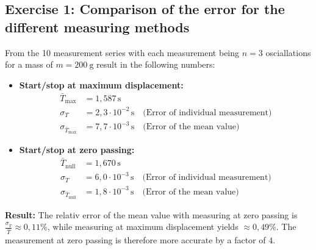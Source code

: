 \subsection{Exercise 1: Comparison of the error for the different measuring methods}
From the 10 measurement series with each measurement being $n=3$ osciallations for a mass of $m = \qty{200}{\gram}$ result in the following numbers:
\begin{itemize}
    \item \textbf{Start/stop at maximum displacement:}
    \begin{align*}
        \bar{T}_{\text{max}} &= 1{,}587\,\mathrm{s} \\
        \sigma_T &= 2{,}3 \cdot 10^{-2}\,\mathrm{s} \quad \text{(Error of individual measurement)} \\
        \sigma_{\bar{T}_{\text{max}}} &= 7{,}7 \cdot 10^{-3}\,\mathrm{s} \quad \text{(Error of the mean value)}
    \end{align*}
    
    \item \textbf{Start/stop at zero passing:}
    \begin{align*}
        \bar{T}_{\text{null}} &= 1{,}670\,\mathrm{s} \\
        \sigma_T &= 6{,}0 \cdot 10^{-3}\,\mathrm{s} \quad \text{(Error of individual measurement)} \\
        \sigma_{\bar{T}_{\text{null}}} &= 1{,}8 \cdot 10^{-3}\,\mathrm{s} \quad \text{(Error of the mean value)}
    \end{align*}
\end{itemize}

\textbf{Result:} The relativ error of the mean value with measuring at zero passing is $\frac{\sigma_{\bar{T}}}{\bar{T}} \approx 0{,}11\%$, while measuring at maximum displacement yields $\approx 0{,}49\%$. The measurement at zero passing is therefore more accurate by a factor of $4$.


